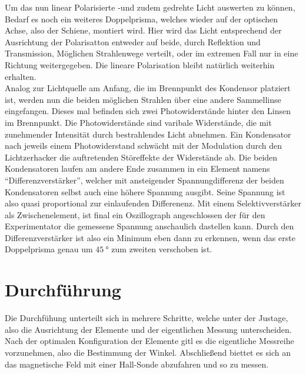 \newline
Um das nun linear Polarisierte -und zudem gedrehte Licht auswerten zu können, Bedarf es noch ein weiteres Doppelprisma, welches wieder auf der optischen Achse, also der Schiene,
montiert wird. Hier wird das Licht entsprechend der Ausrichtung der Polarisatton entweder auf beide, durch Reflektion und Transmission,
Möglichen Strahlenwege verteilt, oder im extremen Fall nur in eine Richtung weitergegeben. Die lineare Polarisation bleibt natürlich weiterhin erhalten.
\\
\newline
Analog zur Lichtquelle am Anfang, die im Brennpunkt des Kondensor platziert ist, werden nun die beiden möglichen Strahlen
über eine andere Sammellinse eingefangen. Dieses mal befinden sich zwei Photowiderstände hinter den Linsen im Brennpunkt.
Die Photowiderstände sind varibale Widerstände, die mit zunehmender Intensität durch bestrahlendes Licht abnehmen.
Ein Kondensator nach jeweils einem Photowiderstand schwächt mit der Modulation durch den Lichtzerhacker die auftretenden Störeffekte 
der Widerstände ab. Die beiden Kondensatoren laufen am andere Ende zusammen in ein Element namens \enquote{Differenzverstärker},
welcher mit ansteigender Spannungdifferenz der beiden Kondensatoren selbst auch eine höhere Spannung ausgibt. Seine Spannung ist also 
quasi proportional zur einlaufenden Differenenz. Mit einem Selektivverstärker als Zwischenelement, ist final ein Oszillograph angeschlossen
der für den Experimentator die gemessene Spannung anschaulich dastellen kann. Durch den Differenzverstärker ist also ein Minimum eben dann zu erkennen, wenn das erste 
Doppelprisma genau um $\SI{45}{\degree}$ zum zweiten verschoben ist.



\section{Durchführung}
Die Durchfühung unterteilt sich in mehrere Schritte, welche unter der Justage, also die Ausrichtung der Elemente
und der eigentlichen Messung unterscheiden. Nach der optimalen Konfiguration der Elemente 
gitl es die eigentliche Messreihe vorzunehmen, also die Bestimmung der Winkel. Abschließend 
biettet es sich an das magnetische Feld mit einer Hall-Sonde abzufahren und so zu messen.

